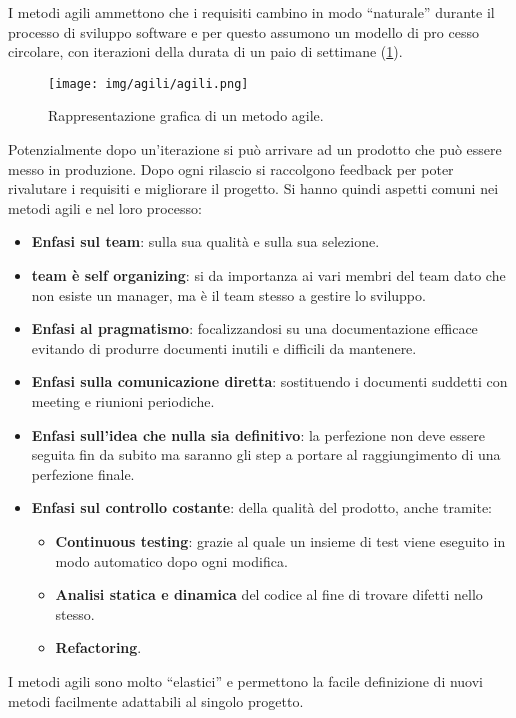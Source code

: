 I metodi agili ammettono che i requisiti cambino in modo “naturale” durante il
processo di sviluppo software e per questo assumono un modello di pro cesso
circolare, con iterazioni della durata di un paio di settimane (\ref{fig:agili}).
\begin{figure}[!ht]
      \centering
      \texttt{[image: img/agili/agili.png]}
      \caption{Rappresentazione grafica di un metodo agile.}
      \label{fig:agili}
\end{figure}
Potenzialmente dopo un'iterazione si può arrivare ad un prodotto che può essere
messo in produzione. Dopo ogni rilascio si raccolgono feedback per poter rivalutare
i requisiti e migliorare il progetto. Si hanno quindi aspetti comuni nei metodi
agili e nel loro processo:
\begin{itemize}
      \item \textbf{Enfasi sul team}: sulla sua qualità e sulla sua selezione.
      \item \textbf{team è self organizing}: si da importanza ai vari membri
            del team dato che non esiste un manager, ma è il team stesso a
            gestire lo sviluppo.
      \item \textbf{Enfasi al pragmatismo}: focalizzandosi su una documentazione
            efficace evitando di produrre documenti inutili e difficili da
            mantenere.
      \item \textbf{Enfasi sulla comunicazione diretta}: sostituendo i documenti
            suddetti con meeting e riunioni periodiche.
      \item \textbf{Enfasi sull'idea che nulla sia definitivo}: la perfezione non
            deve essere seguita fin da subito ma saranno gli step a portare al
            raggiungimento di una perfezione finale.
      \item \textbf{Enfasi sul controllo costante}: della qualità del prodotto,
            anche tramite:
            \begin{itemize}
                  \item \textbf{Continuous testing}: grazie al quale un insieme
                        di test viene eseguito in modo automatico dopo ogni modifica.
                  \item \textbf{Analisi statica e dinamica} del codice al fine
                        di trovare difetti nello stesso.
                  \item \textbf{Refactoring}.
            \end{itemize}
\end{itemize}
I metodi agili sono molto “elastici” e permettono la facile definizione di nuovi
metodi facilmente adattabili al singolo progetto.
